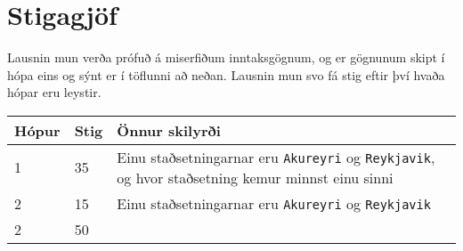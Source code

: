 \section*{Stigagjöf}
Lausnin mun verða prófuð á miserfiðum inntaksgögnum, og er gögnunum skipt í
hópa eins og sýnt er í töflunni að neðan. Lausnin mun svo fá stig eftir því
hvaða hópar eru leystir.

\begin{tabular}{|l|l|l|}
\hline
Hópur & Stig & Önnur skilyrði \\ \hline
1     & 35 & Einu staðsetningarnar eru \texttt{Akureyri} og \texttt{Reykjavik}, og hvor staðsetning kemur minnst einu sinni \\ \hline
2     & 15 & Einu staðsetningarnar eru \texttt{Akureyri} og \texttt{Reykjavik} \\ \hline
2     & 50 &  \\ \hline
\end{tabular}
